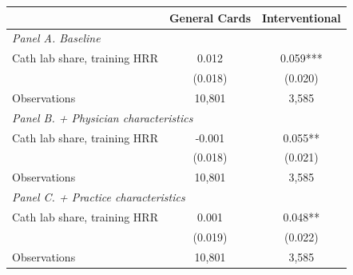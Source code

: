 \begin{tabular}{lcc}
\toprule
 & General Cards & Interventional \\
\midrule
\multicolumn{3}{l}{\textit{Panel A. Baseline}} \\
Cath lab share, training HRR & 0.012 & 0.059*** \\
 & (0.018) & (0.020) \\
Observations & 10,801 & 3,585 \\
\midrule
\multicolumn{3}{l}{\textit{Panel B. + Physician characteristics}} \\
Cath lab share, training HRR & -0.001 & 0.055** \\
 & (0.018) & (0.021) \\
Observations & 10,801 & 3,585 \\
\midrule
\multicolumn{3}{l}{\textit{Panel C. + Practice characteristics}} \\
Cath lab share, training HRR & 0.001 & 0.048** \\
 & (0.019) & (0.022) \\
Observations & 10,801 & 3,585 \\
\bottomrule
\end{tabular}

